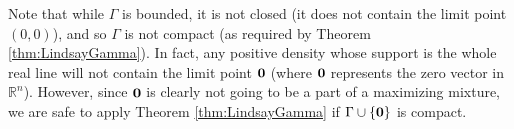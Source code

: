 		Note that while $\Gamma$ is bounded, it is not closed (it does not contain the limit point $(0,0)$), and so $\Gamma$ is not compact (as required by Theorem \ref{thm:LindsayGamma}). In fact, any positive density whose support is the whole real line will not contain the limit point ${\bm{{0}}}$ (where ${\bm{{0}}}$ represents the zero vector in $\mathbb{R}^n$). However, since ${\bm{{0}}}$ is clearly not going to be a part of a maximizing mixture, we are safe to apply Theorem \ref{thm:LindsayGamma} if $\Gamma \cup \{ {\bm{{0}}} \}$ is compact.



